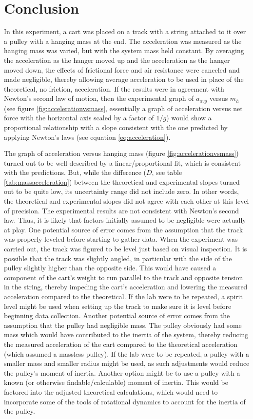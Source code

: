 \documentclass[12pt]{iopart}
\begin{document}
\section{Conclusion}
In this experiment, a cart was placed on a track with a string attached to it over a pulley with a hanging mass at the end.
The acceleration was measured as the hanging mass was varied, but with the system mass held constant. 
By averaging the acceleration as the hanger moved up and the acceleration as the hanger moved down, the effects of frictional force and air resistance were canceled and made negligible, thereby allowing average acceleration to be used in place of the theoretical, no friction, acceleration.
If the results were in agreement with Newton's second law of motion, then the experimental graph of $a_{avg}$ versus $m_h$ (see figure \ref{fig:accelerationvsmass}, essentially a graph of acceleration versus net force with the horizontal axis scaled by a factor of $1/g$) would show a proportional relationship with a slope consistent with the one predicted by applying Newton's laws (see equation \ref{eq:acceleration}).

The graph of acceleration versus hanging mass (figure \ref{fig:accelerationvsmass}) turned out to be well described by a linear/proportional fit, which is consistent with the predictions.
But, while the difference ($D$, see table \ref{tab:massacceleration}) between the theoretical and experimental slopes turned out to be quite low, its uncertainty range did not include zero.
In other words, the theoretical and experimental slopes did not agree with each other at this level of precision. 
The experimental results are not consistent with Newton's second law.
Thus, it is likely that factors initially assumed to be negligible were actually at play.
One potential source of error comes from the assumption that the track was properly leveled before starting to gather data.
When the experiment was carried out, the track was figured to be level just based on visual inspection.
It is possible that the track was slightly angled, in particular with the side of the pulley slightly higher than the opposite side.
This would have caused a component of the cart's weight to run parallel to the track and opposite tension in the string, thereby impeding the cart's acceleration and lowering the measured acceleration compared to the theoretical.
If the lab were to be repeated, a spirit level might be used when setting up the track to make sure it is level before beginning data collection.
Another potential source of error comes from the assumption that the pulley had negligible mass.
The pulley obviously had some mass which would have contributed to the inertia of the system, thereby reducing the measured acceleration of the cart compared to the theoretical acceleration (which assumed a massless pulley).
If the lab were to be repeated, a pulley with a smaller mass and smaller radius might be used, as such adjustments would reduce the pulley's moment of inertia.
Another option might be to use a pulley with a known (or otherwise findable/calculable) moment of inertia.
This would be factored into the adjusted theoretical calculations, which would need to incorporate some of the tools of rotational dynamics to account for the inertia of the pulley.
\end{document}
